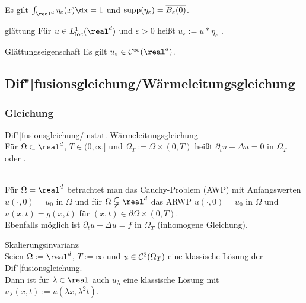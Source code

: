 \begin{Bem}
    Es gilt $\int_{\real^d} \eta_\varepsilon(x) \dx = 1$ und
    $\operatorname{supp}(\eta_\varepsilon) = \overline{B_\varepsilon(0)}$.
\end{Bem}

\begin{Def}{glättung}
    Für $u \in L^1_\loc(\real^d)$ und $\varepsilon > 0$ heißt
    $u_\varepsilon := u \ast \eta_\varepsilon$ .
\end{Def}

\begin{Lemma}{Glättungseigenschaft}
    Es gilt $u_\varepsilon \in \C^\infty(\real^d)$.
\end{Lemma}

\pagebreak

\subsection{%
    Dif"|fusionsgleichung/Wärmeleitungsgleichung%
}

\subsubsection{%
    Gleichung%
}

\begin{Def}{Dif"|fusionsgleichung/instat. Wärmeleitungsgleichung}\\
    Für $\Omega \subset \real^d$, $T \in (0, \infty]$ und $\Omega_T := \Omega \times (0, T)$
    heißt $\partial_t u - \Delta u = 0$ in $\Omega_T$
     oder .
\end{Def}

\begin{Bem}\\
    Für $\Omega = \real^d$ betrachtet man das Cauchy-Problem (AWP) mit Anfangswerten
    $u(\cdot, 0) = u_0$ in $\Omega$ und
    für $\Omega \subsetneqq \real^d$ das ARWP
    $u(\cdot, 0) = u_0$ in $\Omega$ und
    $u(x, t) = g(x, t)$ für $(x, t) \in \partial\Omega \times (0, T)$.\\
    Ebenfalls möglich ist $\partial_t u - \Delta u = f$ in $\Omega_T$ (inhomogene Gleichung).
\end{Bem}

\linie

\begin{Satz}{Skalierungsinvarianz}\\
    Seien $\Omega := \real^d$, $T := \infty$ und $u \in \mathcal{C}^2(\Omega_T)$ eine klassische
    Lösung der Dif"|fusionsgleichung.\\
    Dann ist für $\lambda \in \real$ auch $u_\lambda$ eine klassische Lösung
    mit $u_\lambda(x, t) := u(\lambda x, \lambda^2 t)$.
\end{Satz}

